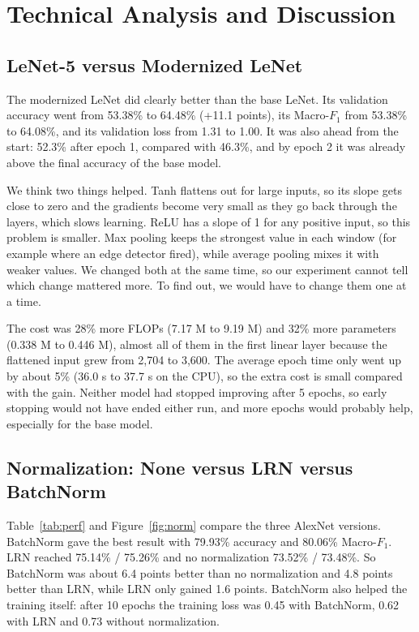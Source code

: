 \documentclass[12pt]{article}
\begin{document}
\section{Technical Analysis and Discussion}

\subsection{LeNet-5 versus Modernized LeNet}

The modernized LeNet did clearly better than the base LeNet. Its validation accuracy went from 53.38\% to 64.48\%
(+11.1 points), its Macro-$F_1$ from 53.38\% to 64.08\%, and its validation loss from 1.31 to 1.00. It was also ahead
from the start: 52.3\% after epoch 1, compared with 46.3\%, and by epoch 2 it was already above the final accuracy of
the base model.

We think two things helped. Tanh flattens out for large inputs, so its slope gets close to zero and the gradients become
very small as they go back through the layers, which slows learning. ReLU has a slope of 1 for any positive input, so
this problem is smaller. Max pooling keeps the strongest value in each window (for example where an edge detector
fired), while average pooling mixes it with weaker values. We changed both at the same time, so our experiment cannot
tell which change mattered more. To find out, we would have to change them one at a time.

The cost was 28\% more FLOPs (7.17 M to 9.19 M) and 32\% more parameters (0.338 M to 0.446 M), almost all of them in the
first linear layer because the flattened input grew from 2{,}704 to 3{,}600. The average epoch time only went up by
about 5\% (36.0 s to 37.7 s on the CPU), so the extra cost is small compared with the gain. Neither model had stopped
improving after 5 epochs, so early stopping would not have ended either run, and more epochs would probably help,
especially for the base model.

\subsection{Normalization: None versus LRN versus BatchNorm}

Table~\ref{tab:perf} and Figure~\ref{fig:norm} compare the three AlexNet versions. BatchNorm gave the best result with
79.93\% accuracy and 80.06\% Macro-$F_1$. LRN reached 75.14\% / 75.26\% and no normalization 73.52\% / 73.48\%. So
BatchNorm was about 6.4 points better than no normalization and 4.8 points better than LRN, while LRN only gained 1.6
points. BatchNorm also helped the training itself: after 10 epochs the training loss was 0.45 with BatchNorm, 0.62 with
LRN and 0.73 without normalization.
\end{document}
